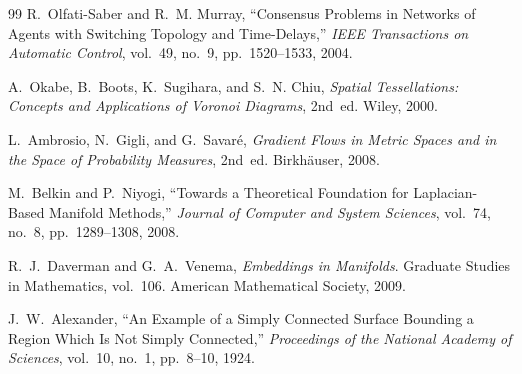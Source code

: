 \documentclass[11pt,fleqn]{book}
\numberwithin{equation}{chapter}
\theoremstyle{plain}
\theoremstyle{definition}
\theoremstyle{remark}
\begin{document}
\begin{thebibliography}{99}
R.~Olfati-Saber and R.~M. Murray, ``Consensus Problems in Networks of Agents with Switching Topology and Time-Delays,'' \emph{IEEE Transactions on Automatic Control}, vol.~49, no.~9, pp.~1520--1533, 2004.

A.~Okabe, B.~Boots, K.~Sugihara, and S.~N. Chiu, \emph{Spatial Tessellations: Concepts and Applications of Voronoi Diagrams}, 2nd~ed. Wiley, 2000.

L.~Ambrosio, N.~Gigli, and G.~Savaré, \emph{Gradient Flows in Metric Spaces and in the Space of Probability Measures}, 2nd~ed. Birkhäuser, 2008.

M.~Belkin and P.~Niyogi, ``Towards a Theoretical Foundation for Laplacian-Based Manifold Methods,'' \emph{Journal of Computer and System Sciences}, vol.~74, no.~8, pp.~1289--1308, 2008.

R.~J.~Daverman and G.~A.~Venema, \emph{Embeddings in Manifolds}. Graduate Studies in Mathematics, vol.~106. American Mathematical Society, 2009.

J.~W.~Alexander, ``An Example of a Simply Connected Surface Bounding a Region Which Is Not Simply Connected,'' \emph{Proceedings of the National Academy of Sciences}, vol.~10, no.~1, pp.~8--10, 1924.

\end{thebibliography}
\end{document}
